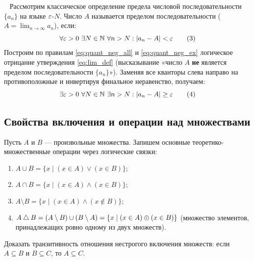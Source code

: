 \begin{example} ~
    Рассмотрим классическое определение предела числовой 
    последовательности $\{a_n\}$ на языке $\varepsilon$-$N$. Число $A$ называется 
    пределом последовательности ($A = \lim_{n \to \infty} a_n$), если:
    \begin{equation} \label{eq:lim_def}
        \forall \varepsilon > 0 \ \exists N \in \mathbb{N} \ \forall n > N : 
        \left| a_n - A \right| < \varepsilon \tag{3}
    \end{equation}
    Построим по правилам \eqref{eq:quant_neg_all} и \eqref{eq:quant_neg_ex} 
    логическое отрицание утверждения \eqref{eq:lim_def} (высказывание 
    «число $A$ \textbf{не} является пределом последовательности $\{a_n\}$»). 
    Заменяя все кванторы слева направо на противоположные и инвертируя 
    финальное неравенство, получаем:
    \begin{equation} \label{eq:lim_neg}
        \exists \varepsilon > 0 \ \forall N \in \mathbb{N} \ \exists n > N : 
        \left| a_n - A \right| \ge \varepsilon \tag{4}
    \end{equation}
\end{example}

\subsection{Свойства включения и операции над множествами}

\begin{definition}
    Пусть $A$ и $B$ --- произвольные множества. Запишем основные 
    теоретико-множественные операции через логические связки:
    \begin{enumerate}
        \item {} 
        $A \cup B = \{x \mid (x \in A) \lor (x \in B)\}$;
        \item {} 
        $A \cap B = \{x \mid (x \in A) \land (x \in B)\}$;
        \item {} 
        $A \setminus B = \{x \mid (x \in A) \land (x \notin B)\}$;
        \item {} 
        $A \mathbin{\triangle} B = (A \setminus B) \cup (B \setminus A) = 
        \{x \mid (x \in A) \oplus (x \in B)\}$ (множество элементов, 
        принадлежащих ровно одному из двух множеств).
    \end{enumerate}
\end{definition}

\begin{problem}
    Доказать транзитивность отношения нестрогого включения множеств: 
    если $A \subseteq B$ и $B \subseteq C$, то $A \subseteq C$.
\end{problem}

